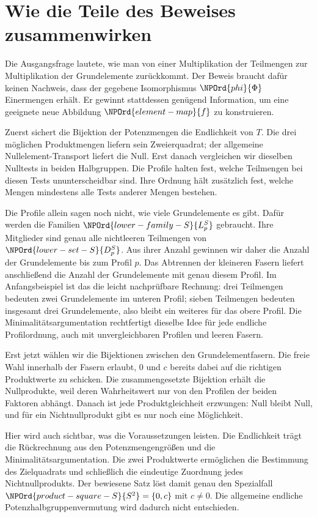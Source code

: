 \section*{Wie die Teile des Beweises zusammenwirken}

Die Ausgangsfrage lautete, wie man von einer Multiplikation der
Teilmengen zur Multiplikation der Grundelemente zurückkommt.
Der Beweis braucht dafür keinen Nachweis, dass der gegebene
Isomorphismus \(\NPOrd{phi}{\Phi}\) Einermengen erhält. Er gewinnt stattdessen
genügend Information, um eine geeignete neue Abbildung \(\NPOrd{element-map}{f}\)
zu konstruieren.

Zuerst sichert die Bijektion der Potenzmengen die Endlichkeit von \(T\).
Die drei möglichen Produktmengen liefern sein Zweierquadrat;
der allgemeine Nullelement-Transport liefert die Null.
Erst danach vergleichen wir dieselben
Nulltests in beiden Halbgruppen. Die Profile halten fest,
welche Teilmengen bei diesen Tests ununterscheidbar sind.
Ihre Ordnung hält zusätzlich fest, welche Mengen mindestens
alle Tests anderer Mengen bestehen.

Die Profile allein sagen noch nicht, wie viele Grundelemente es gibt.
Dafür werden die Familien \(\NPOrd{lower-family-S}{L_p^S}\) gebraucht.
Ihre Mitglieder sind genau alle nichtleeren Teilmengen von \(\NPOrd{lower-set-S}{D_p^S}\).
Aus ihrer Anzahl gewinnen wir daher die Anzahl der Grundelemente
bis zum Profil \(p\). Das Abtrennen der kleineren Fasern liefert
anschließend die Anzahl der Grundelemente mit genau diesem Profil.
Im Anfangsbeispiel ist das die leicht nachprüfbare Rechnung:
drei Teilmengen bedeuten zwei Grundelemente im unteren Profil;
sieben Teilmengen bedeuten insgesamt drei Grundelemente,
also bleibt ein weiteres für das obere Profil.
Die Minimalitätsargumentation rechtfertigt dieselbe Idee für jede
endliche Profilordnung, auch mit unvergleichbaren Profilen und
leeren Fasern.

\par{}
Erst jetzt wählen wir die Bijektionen zwischen den Grundelementfasern.
Die freie Wahl innerhalb der Fasern erlaubt, \(0\) und \(c\) bereits
dabei auf die richtigen Produktwerte zu schicken.
Die zusammengesetzte Bijektion erhält die Nullprodukte, weil deren
Wahrheitswert nur von den Profilen der beiden Faktoren abhängt.
Danach ist jede Produktgleichheit erzwungen:
Null bleibt Null, und für ein Nichtnullprodukt gibt es nur noch
eine Möglichkeit.

\par{}
Hier wird auch sichtbar, was die Voraussetzungen leisten.
Die Endlichkeit trägt die Rückrechnung aus den Potenzmengengrößen
und die Minimalitätsargumentation.
Die zwei Produktwerte ermöglichen die Bestimmung des Zielquadrats
und schließlich die eindeutige Zuordnung jedes Nichtnullprodukts.
Der bewiesene Satz löst damit genau den Spezialfall
\(\NPOrd{product-square-S}{S^2}=\{0,c\}\) mit \(c\ne0\).
Die allgemeine endliche Potenzhalbgruppenvermutung wird dadurch
nicht entschieden.

